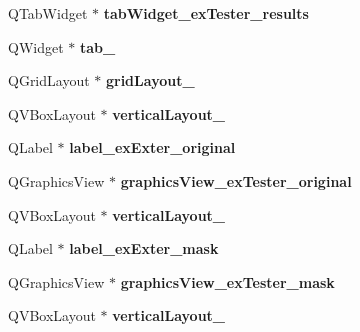 \begin{DoxyCompactItemize}
\item 
\mbox{\label{class_ui___main_window_a86e042017bd9eae14f2984b24c1b0a36}} 
Q\+Tab\+Widget $\ast$ {\bfseries tab\+Widget\+\_\+ex\+Tester\+\_\+results}
\item 
\mbox{\label{class_ui___main_window_a0e030dc0e538b74ec4887801fb73ffa8}} 
Q\+Widget $\ast$ {\bfseries tab\+\_}
\item 
\mbox{\label{class_ui___main_window_ad113cf7b76aaf178473555bdf64ff035}} 
Q\+Grid\+Layout $\ast$ {\bfseries grid\+Layout\+\_}
\item 
\mbox{\label{class_ui___main_window_ae4610348fe273fbc4bfcaab26cebd918}} 
Q\+V\+Box\+Layout $\ast$ {\bfseries vertical\+Layout\+\_}
\item 
\mbox{\label{class_ui___main_window_a3f552fb29ff6853f9e84e548fe273abb}} 
Q\+Label $\ast$ {\bfseries label\+\_\+ex\+Exter\+\_\+original}
\item 
\mbox{\label{class_ui___main_window_aff0bb204e10b352caae649bd21a435ae}} 
Q\+Graphics\+View $\ast$ {\bfseries graphics\+View\+\_\+ex\+Tester\+\_\+original}
\item 
\mbox{\label{class_ui___main_window_a69beb22778bdbf7f11e4e0f62a8684f2}} 
Q\+V\+Box\+Layout $\ast$ {\bfseries vertical\+Layout\+\_}
\item 
\mbox{\label{class_ui___main_window_afdac5afd9765bcd912ef1f793f4ddaec}} 
Q\+Label $\ast$ {\bfseries label\+\_\+ex\+Exter\+\_\+mask}
\item 
\mbox{\label{class_ui___main_window_a45b2e73bb6d585c2e5b7b7844df535d3}} 
Q\+Graphics\+View $\ast$ {\bfseries graphics\+View\+\_\+ex\+Tester\+\_\+mask}
\item 
\mbox{\label{class_ui___main_window_aaade2402f848e11e2f4e116519856756}} 
Q\+V\+Box\+Layout $\ast$ {\bfseries vertical\+Layout\+\_}
\item 
\mbox{\label{class_ui___main_window_af3fc30b4291d9b2dabcb51fe3d4466c0}} 

\end{DoxyCompactItemize}
